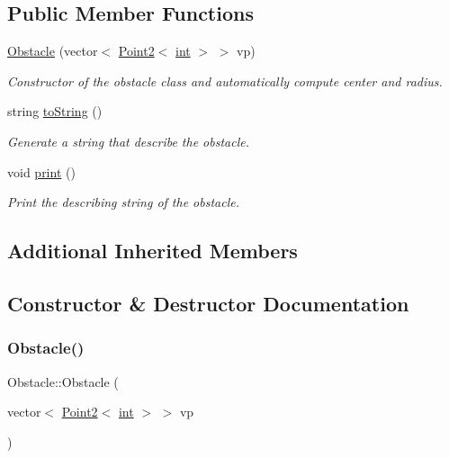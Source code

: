\subsection*{Public Member Functions}
\begin{DoxyCompactItemize}
\item 
\mbox{\hyperlink{class_obstacle_a01dd139293a7b40de8d25c11cdb8cfd8}{Obstacle}} (vector$<$ \mbox{\hyperlink{class_point2}{Point2}}$<$ \mbox{\hyperlink{draw_8hh_aa620a13339ac3a1177c86edc549fda9b}{int}} $>$ $>$ vp)
\begin{DoxyCompactList}\small\item\em Constructor of the obstacle class and automatically compute center and radius. \end{DoxyCompactList}\item 
string \mbox{\hyperlink{class_obstacle_aa2ed0727bded2b8a0265157fd298219e}{to\+String}} ()
\begin{DoxyCompactList}\small\item\em Generate a string that describe the obstacle. \end{DoxyCompactList}\item 
void \mbox{\hyperlink{class_obstacle_a5484b8b93564f029d1e688b477be7d1d}{print}} ()
\begin{DoxyCompactList}\small\item\em Print the describing string of the obstacle. \end{DoxyCompactList}\end{DoxyCompactItemize}
\subsection*{Additional Inherited Members}


\subsection{Constructor \& Destructor Documentation}
\mbox{\label{class_obstacle_a01dd139293a7b40de8d25c11cdb8cfd8}} 
\subsubsection{\texorpdfstring{Obstacle()}{Obstacle()}}
{\footnotesize\ttfamily Obstacle\+::\+Obstacle (\begin{DoxyParamCaption}\item[{vector$<$ \mbox{\hyperlink{class_point2}{Point2}}$<$ \mbox{\hyperlink{draw_8hh_aa620a13339ac3a1177c86edc549fda9b}{int}} $>$ $>$}]{vp }\end{DoxyParamCaption})}



